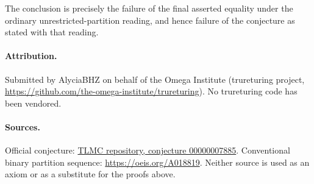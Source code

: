 \documentclass[11pt]{article}
\begin{document}
The conclusion is precisely the failure of the final asserted equality under the ordinary unrestricted-partition reading, and hence failure of the conjecture as stated with that reading.

\paragraph{Attribution.}
Submitted by AlyciaBHZ on behalf of the Omega Institute (trureturing project, \url{https://github.com/the-omega-institute/trureturing}). No trureturing code has been vendored.

\paragraph{Sources.}
Official conjecture: \href{https://github.com/The-Last-Math-Competition/The-Last-Math-Competition/blob/main/conjectures/00000007885.md}{TLMC repository, conjecture 00000007885}. Conventional binary partition sequence: \url{https://oeis.org/A018819}. Neither source is used as an axiom or as a substitute for the proofs above.
\end{document}
